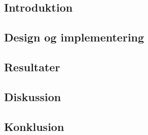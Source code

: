 \documentclass[../journal2.tex]{subfiles}
\begin{document}
\subsection{Introduktion}

\subsection{Design og implementering}

\subsection{Resultater}

\subsection{Diskussion}

\subsection{Konklusion}
\end{document}
